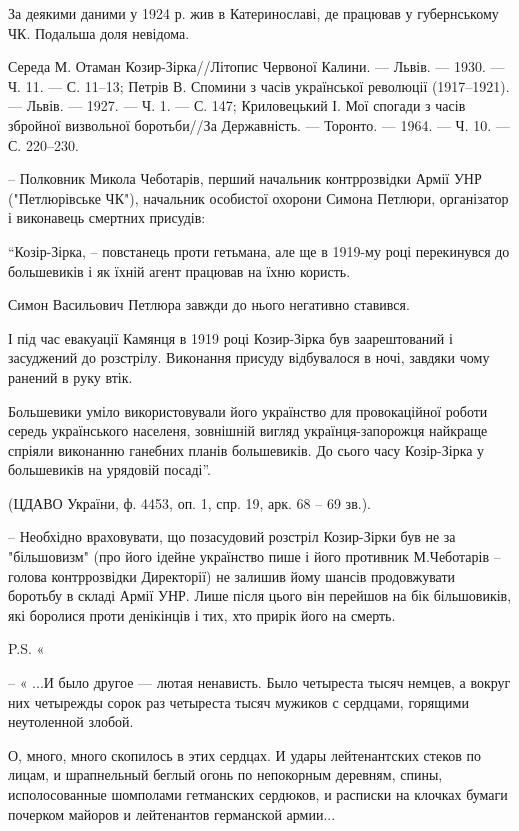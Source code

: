 За деякими даними у 1924 р. жив в Катеринославі, де працював у губернському ЧК. Подальша доля невідома.

Середа М. Отаман Козир-Зірка//Літопис Червоної Калини. — Львів. — 1930. — Ч.
11. — С. 11–13; Петрів В. Спомини з часів української революції (1917–1921). —
Львів. — 1927. — Ч. 1. — С. 147; Криловецький І. Мої спогади з часів збройної
визвольної боротьби//За Державність. — Торонто. — 1964. — Ч. 10. — С. 220–230.

\zzrule

– Полковник Микола Чеботарів, перший начальник контррозвідки Армії УНР
("Петлюрівське ЧК"), начальник особистої охорони Симона Петлюри, організатор і
виконавець смертних присудів:

“Козір-Зірка, – повстанець проти гетьмана, але ще в 1919-му році перекинувся до
большевиків і як їхній агент працював на їхню користь. 

Симон Васильович Петлюра завжди до нього негативно ставився. 

І під час евакуації Камянця в 1919 році Козир-Зірка був заарештований і
засуджений до розстрілу. Виконання присуду відбувалося в ночі, завдяки чому
ранений в руку втік.

Большевики уміло використовували його українство для провокаційної роботи
середь українського населеня, зовнішній вигляд українця-запорожця найкраще
спріяли виконанню ганебних планів большевиків. До сього часу Козір-Зірка у
большевиків на урядовій посаді”.

 (ЦДАВО України, ф. 4453, оп. 1, спр. 19, арк. 68 – 69 зв.).

\zzrule

– Необхідно враховувати, що позасудовий розстріл Козир-Зірки був не за
"більшовизм" (про його ідейне українство пише і його противник М.Чеботарів
– голова контррозвідки Директорії) не залишив йому шансів продовжувати
боротьбу в складі Армії УНР. Лише після цього він перейшов на бік
більшовиків, які боролися проти денікінців і тих, хто прирік його на
смерть. 

P.S. «

– « ...И было другое — лютая ненависть. Было четыреста тысяч немцев, а вокруг них
четырежды сорок раз четыреста тысяч мужиков с сердцами, горящими неутоленной
злобой. 

О, много, много скопилось в этих сердцах. И удары лейтенантских стеков по
лицам, и шрапнельный беглый огонь по непокорным деревням, спины,
исполосованные шомполами гетманских сердюков, и расписки на клочках бумаги
почерком майоров и лейтенантов германской армии...

